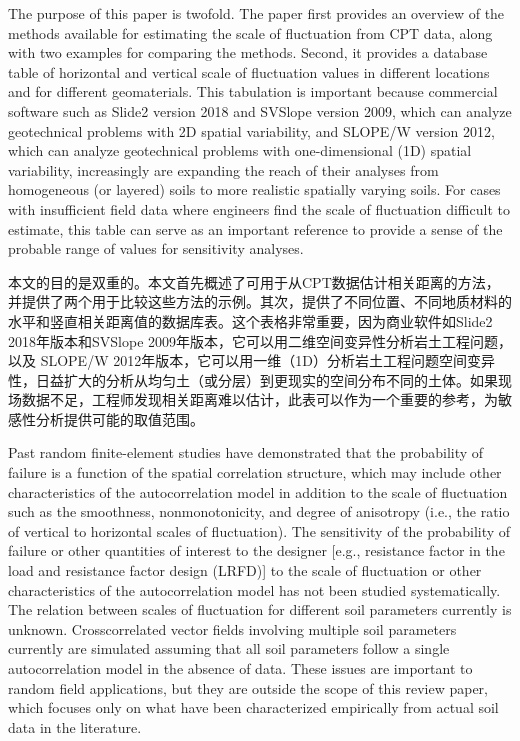 \begin{ParaColumn}
    \switchcolumn*

    The purpose of this paper is twofold. The paper first provides an overview of the methods available for estimating the scale of fluctuation from CPT data, along with two examples for comparing the methods. Second, it provides a database table of horizontal and vertical scale of fluctuation values in different locations and for different geomaterials. This tabulation is important because commercial software such as Slide2 version 2018 and SVSlope version 2009, which can analyze geotechnical problems with 2D spatial variability, and SLOPE/W version 2012, which can analyze geotechnical problems with one-dimensional (1D) spatial variability, increasingly are expanding the reach of their analyses from homogeneous (or layered) soils to more realistic spatially varying soils. For cases with insufficient field data where engineers find the scale of fluctuation difficult to estimate, this table can serve as an important reference to provide a sense of the probable range of values for sensitivity analyses.

    \switchcolumn

    本文的目的是双重的。本文首先概述了可用于从CPT数据估计相关距离的方法，并提供了两个用于比较这些方法的示例。其次，提供了不同位置、不同地质材料的水平和竖直相关距离值的数据库表。这个表格非常重要，因为商业软件如Slide2 2018年版本和SVSlope 2009年版本，它可以用二维空间变异性分析岩土工程问题，以及 SLOPE/W 2012年版本，它可以用一维（1D）分析岩土工程问题空间变异性，日益扩大的分析从均匀土（或分层）到更现实的空间分布不同的土体。如果现场数据不足，工程师发现相关距离难以估计，此表可以作为一个重要的参考，为敏感性分析提供可能的取值范围。

    \switchcolumn*

    Past random finite-element studies have demonstrated that the probability of failure is a function of the spatial correlation structure, which may include other characteristics of the autocorrelation model in addition to the scale of fluctuation such as the smoothness, nonmonotonicity, and degree of anisotropy (i.e., the ratio of vertical to horizontal scales of fluctuation). The sensitivity of the probability of failure or other quantities of interest to the designer [e.g., resistance factor in the load and resistance factor design (LRFD)] to the scale of fluctuation or other characteristics of the autocorrelation model has not been studied systematically. The relation between scales of fluctuation for different soil parameters currently is unknown. Crosscorrelated vector fields involving multiple soil parameters currently are simulated assuming that all soil parameters follow a single autocorrelation model in the absence of data. These issues are important to random field applications, but they are outside the scope of this review paper, which focuses only on what have been characterized empirically from actual soil data in the literature.


\end{ParaColumn}

